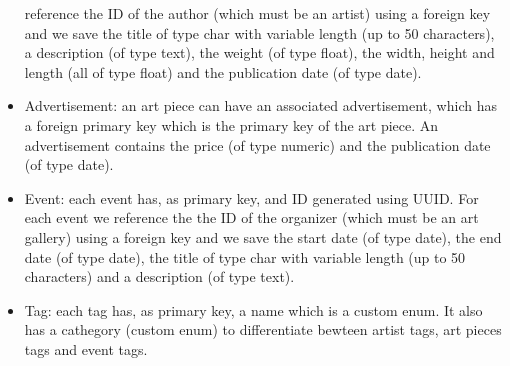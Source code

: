 \begin{itemize}
    reference the ID of the author (which must be an artist) using a foreign key and we save the title of type char
    with variable length (up to 50 characters), a description (of type text), the weight (of type float), the width, 
    height and length (all of type float) and the publication date (of type date).
    \item Advertisement: an art piece can have an associated advertisement, which has a foreign primary key which 
    is the primary key of the art piece. An advertisement contains the price (of type numeric) and the publication
    date (of type date).
    \item Event: each event has, as primary key, and ID generated using UUID. For each event we reference the 
    the ID of the organizer (which must be an art gallery) using a foreign key and we save the start date (of type
    date), the end date (of type date), the title of type char with variable length (up to 50 characters) and a 
    description (of type text).
    \item Tag: each tag has, as primary key, a name which is a custom enum. It also has a cathegory (custom enum) to
    differentiate bewteen artist tags, art pieces tags and event tags.
\end{itemize}